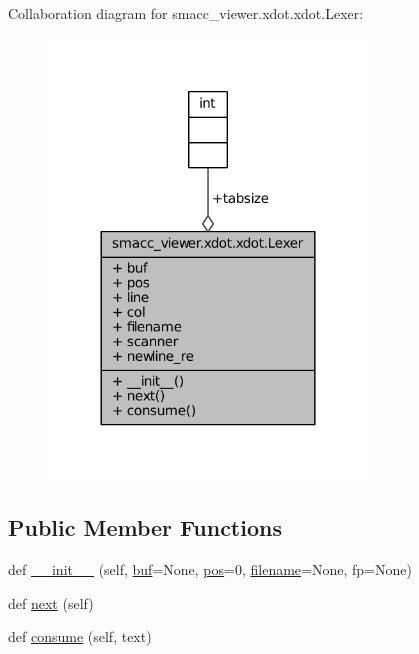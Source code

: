 Collaboration diagram for smacc\+\_\+viewer.\+xdot.\+xdot.\+Lexer\+:
\nopagebreak
\begin{figure}[H]
\begin{center}
\leavevmode
\includegraphics[width=240pt]{classsmacc__viewer_1_1xdot_1_1xdot_1_1Lexer__coll__graph}
\end{center}
\end{figure}
\subsection*{Public Member Functions}
\begin{DoxyCompactItemize}
\item 
def \hyperlink{classsmacc__viewer_1_1xdot_1_1xdot_1_1Lexer_a21fd2072c3fcad9d7bf119ffea49e659}{\+\_\+\+\_\+init\+\_\+\+\_\+} (self, \hyperlink{classsmacc__viewer_1_1xdot_1_1xdot_1_1Lexer_ae6f555ad406cdd55d65f8d35d5f26825}{buf}=None, \hyperlink{classsmacc__viewer_1_1xdot_1_1xdot_1_1Lexer_a5748d2ef8e2cd8390bec0bd89621c2d6}{pos}=0, \hyperlink{classsmacc__viewer_1_1xdot_1_1xdot_1_1Lexer_aeec6d9f9d2545d6a4bc01b386b81ac12}{filename}=None, fp=None)
\item 
def \hyperlink{classsmacc__viewer_1_1xdot_1_1xdot_1_1Lexer_ac2ef5bd824ca2b7d683c3084f1182c3c}{next} (self)
\item 
def \hyperlink{classsmacc__viewer_1_1xdot_1_1xdot_1_1Lexer_a4f98cdb3cfb78976a9e4b096f300342d}{consume} (self, text)
\end{DoxyCompactItemize}
